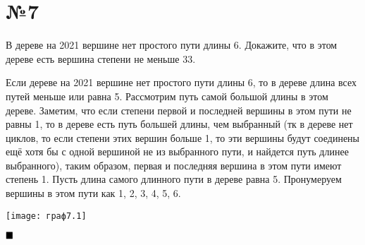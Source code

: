 \documentclass[a4paper, 16pt]{article}
\newenvironment{proof}[1][Доказательство]{%
	\begin{trivlist}
		\item[\hskip \labelsep {\bfseries #1:}]
		\item \hspace{14pt}
	}{
		$ \hfill\blacksquare $
	\end{trivlist}
	\hfill\break
}
\begin{document}
		\section*{№7}	
			В дереве на 2021 вершине нет простого пути длины 6. Докажите, что в этом дереве есть вершина степени не меньше 33.
			\begin{proof}
				Если дереве на 2021 вершине нет простого пути длины 6, то в дереве длина всех путей меньше или равна 5.  Рассмотрим путь самой большой длины в этом дереве. Заметим, что если степени первой и последней вершины в этом пути не равны 1, то в дереве есть путь большей длины, чем выбранный (тк в дереве нет циклов, то если степени этих вершин больше 1, то эти вершины будут соединены ещё хотя бы с одной вершиной не из выбранного пути, и найдется путь длинее выбранного), таким образом, первая и последняя вершина в этом пути имеют степень 1. Пусть длина самого длинного пути в дереве равна 5. Пронумеруем вершины в этом пути как 1, 2, 3, 4, 5, 6. 
				
				\texttt{[image: граф7.1]}
				

\end{proof}
\end{document}
